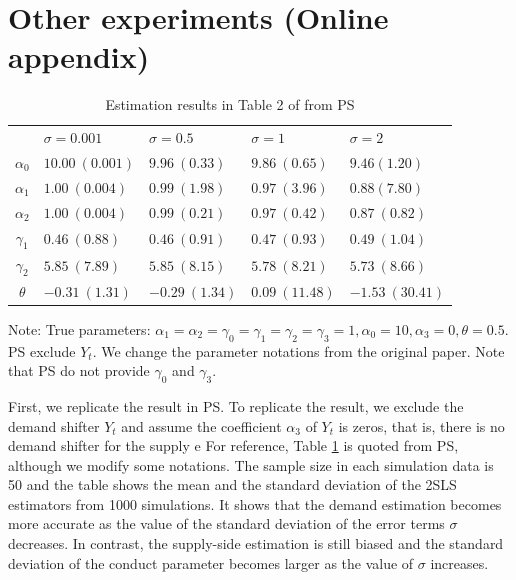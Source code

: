 \documentclass[11pt, a4paper]{article}
\begin{document}



\newpage
\appendix
\section{Other experiments (Online appendix)}
\begin{table}[!htbp]
    \caption{Estimation results in Table 2 of from PS}
    \label{tb:linear_linear_sigma_Perloff_Shen}
    \begin{center}
        \begin{tabular}{cllll}
            \hline
            & $\sigma=0.001$ & $\sigma=0.5$ & $\sigma=1$ & $\sigma=2$ \\
            $\alpha_0$ & $10.00\ (0.001)$ & $9.96\ (0.33)$ & $9.86\ (0.65)$ & $9.46 (1.20)$ \\
            $\alpha_1$ & $1.00\ (0.004)$ & $0.99\ (1.98)$ & $0.97\ (3.96)$ & $0.88 (7.80)$ \\
            $\alpha_2$ & $1.00\ (0.004)$ & $0.99\ (0.21)$ & $0.97\ (0.42)$ & $0.87\ (0.82)$ \\
            $\gamma_1$ & $0.46\ (0.88)$ & $0.46\ (0.91)$ & $0.47\ (0.93)$ & $0.49\ (1.04)$ \\
            $\gamma_2$ & $5.85\ (7.89)$ & $5.85\ (8.15)$ & $5.78\ (8.21)$ & $5.73\ (8.66)$ \\
            $\theta$ & $-0.31\ (1.31)$ & $-0.29\ (1.34)$ & $0.09\ (11.48)$ & $-1.53\ (30.41)$ \\
            \hline
        \end{tabular}
    \end{center}\footnotesize
    Note: True parameters: $\alpha_1 = \alpha_2 = \gamma_0 = \gamma_1 = \gamma_2  = \gamma_3 = 1, \alpha_0 = 10, \alpha_3 = 0,  \theta = 0.5$. PS exclude $Y_t$. We change the parameter notations from the original paper. Note that PS do not provide $\gamma_0$ and $\gamma_3$.
\end{table}

First, we replicate the result in PS.
To replicate the result, we exclude the demand shifter $Y_t$ and assume the coefficient $\alpha_3$ of $Y_t$ is zeros, that is, there is no demand shifter for the supply e
For reference, Table \ref{tb:linear_linear_sigma_Perloff_Shen} is quoted from PS, although we modify some notations.
The sample size in each simulation data is 50 and the table shows the mean and the standard deviation of the 2SLS estimators from 1000 simulations.
It shows that the demand estimation becomes more accurate as the value of the standard deviation of the error terms $\sigma$ decreases.
In contrast, the supply-side estimation is still biased and the standard deviation of the conduct parameter becomes larger as the value of $\sigma$ increases.
\end{document}
